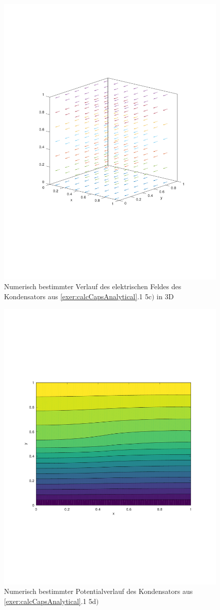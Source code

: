 \documentclass[Protokollheft.tex]{subfiles}
\begin{document}
\begin{figure}[h!]
	\centering
	\includegraphics[trim = 20mm 70mm 20mm 70mm, clip,width=0.7\linewidth]{E_3D_C.pdf}
	\caption{Numerisch bestimmter Verlauf des elektrischen Feldes des Kondensators aus \ref{exer:calcCapsAnalytical}.1 5c$)$ in 3D}
\end{figure}

\begin{figure}[h!]
	\centering
	\includegraphics[trim = 20mm 70mm 20mm 70mm, clip,width=0.7\linewidth]{potential_D.pdf}
	\caption{Numerisch bestimmter Potentialverlauf des Kondensators aus \ref{exer:calcCapsAnalytical}.1 5d$)$}
\end{figure}
\end{document}
